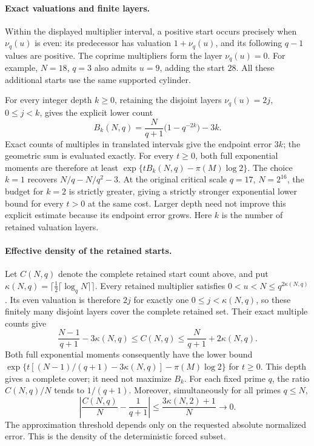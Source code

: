 \paragraph{Exact valuations and finite layers.}
Within the displayed multiplier interval, a positive start occurs
precisely when $\nu_q(u)$ is even: its predecessor has valuation
$1+\nu_q(u)$, and its following $q-1$ values are positive.
The coprime multipliers form the layer $\nu_q(u)=0$.
For example, $N=18$, $q=3$ also admits $u=9$, adding the start $28$.
All these additional starts use the same supported cylinder.

For every integer depth $k\geq0$, retaining the disjoint layers
$\nu_q(u)=2j$, $0\leq j<k$, gives the explicit lower count
\[
 B_k(N,q)=\frac{N}{q+1}\bigl(1-q^{-2k}\bigr)-3k.
\]
Exact counts of multiples in translated intervals give the endpoint
error $3k$; the geometric sum is evaluated exactly.  For every $t\geq0$,
both full exponential moments are therefore at least
$\exp\{tB_k(N,q)-\pi(M)\log2\}$.
The choice $k=1$ recovers $N/q-N/q^2-3$.
At the original critical scale $q=17$, $N=2^{16}$, the budget for
$k=2$ is strictly greater, giving a strictly stronger exponential
lower bound for every $t>0$ at the same cost.
Larger depth need not improve this explicit estimate because its
endpoint error grows.  Here $k$ is the number of retained valuation layers.

\paragraph{Effective density of the retained starts.}
Let $C(N,q)$ denote the complete retained start count above, and put
$\kappa(N,q)=\lceil\tfrac12\lceil\log_q N\rceil\rceil$.
Every retained multiplier satisfies $0<u<N\leq q^{2\kappa(N,q)}$.
Its even valuation is therefore $2j$ for exactly one
$0\leq j<\kappa(N,q)$, so these finitely many disjoint layers cover
the complete retained set.  Their exact multiple counts give
\[
 \frac{N-1}{q+1}-3\kappa(N,q)\leq C(N,q)
 \leq\frac{N}{q+1}+2\kappa(N,q).
\]
Both full exponential moments consequently have the lower bound
$\exp\{t[(N-1)/(q+1)-3\kappa(N,q)]-\pi(M)\log2\}$ for $t\geq0$.
This depth gives a complete cover; it need not maximize $B_k$.
For each fixed prime $q$, the ratio $C(N,q)/N$ tends to $1/(q+1)$.
Moreover, simultaneously for all primes $q\leq N$,
\[
 \left|\frac{C(N,q)}N-\frac1{q+1}\right|
 \leq\frac{3\kappa(N,2)+1}{N}\longrightarrow0.
\]
The approximation threshold depends only on the requested absolute
normalized error.  This is the density of the deterministic forced
subset.

